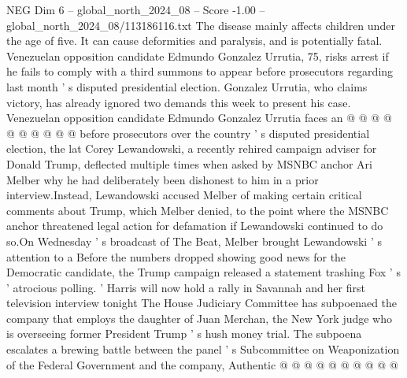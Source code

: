 \begin{textsample}{NEG Dim 6 – global\_north\_2024\_08 – Score -1.00 – global\_north\_2024\_08/113186116.txt}
The disease mainly affects children under the age of five.
It can cause deformities and paralysis, and is potentially fatal.
Venezuelan opposition candidate Edmundo Gonzalez Urrutia, 75, risks arrest if he fails to comply with a third summons to appear before prosecutors regarding last month ' s disputed presidential election.
Gonzalez Urrutia, who claims victory, has already ignored two demands this week to present his case.
Venezuelan opposition candidate Edmundo Gonzalez Urrutia faces an @ @ @ @ @ @ @ @ @ @ before prosecutors over the country ' s disputed presidential election, the lat Corey Lewandowski, a recently rehired campaign adviser for Donald Trump, deflected multiple times when asked by MSNBC anchor Ari Melber why he had deliberately been dishonest to him in a prior interview.Instead, Lewandowski accused Melber of making certain critical comments about Trump, which Melber denied, to the point where the MSNBC anchor threatened legal action for defamation if Lewandowski continued to do so.On Wednesday ' s broadcast of The Beat, Melber brought Lewandowski ' s attention to a Before the numbers dropped showing good news for the Democratic candidate, the Trump campaign released a statement trashing Fox ' s ' atrocious polling. ' Harris will now hold a rally in Savannah and her first television interview tonight The House Judiciary Committee has subpoenaed the company that employs the daughter of Juan Merchan, the New York judge who is overseeing former President Trump ' s hush money trial.
The subpoena escalates a brewing battle between the panel ' s Subcommittee on Weaponization of the Federal Government and the company, Authentic @ @ @ @ @ @ @ @ @ @

\end{textsample}

